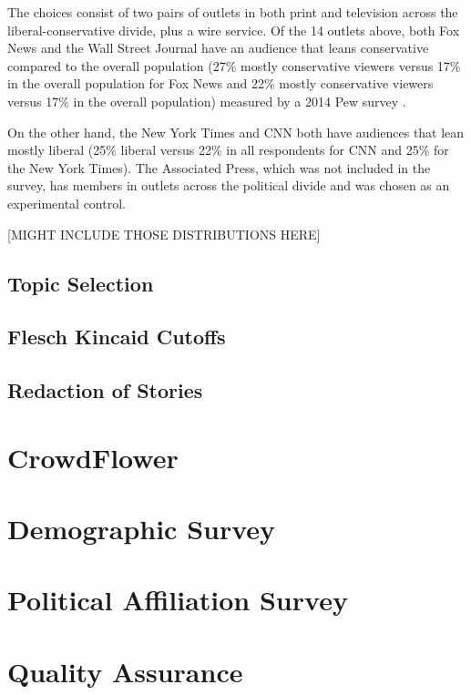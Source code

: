 The choices consist of two pairs of outlets in both print and television across the liberal-conservative divide, plus a wire service. Of the 14 outlets above, both Fox News and the Wall Street Journal have an audience that leans conservative compared to the overall population (27\% mostly conservative viewers versus 17\% in the overall population for Fox News and 22\% mostly conservative viewers versus 17\% in the overall population) measured by a 2014 Pew survey \cite{PoliticalPolarization}.

On the other hand, the New York Times and CNN both have audiences that lean mostly liberal (25\% liberal versus 22\% in all respondents for CNN and 25\% for the New York Times). The Associated Press, which was not included in the survey, has members in outlets across the political divide and was chosen as an experimental control. 

[MIGHT INCLUDE THOSE DISTRIBUTIONS HERE]

\subsection {Topic Selection}










\subsection {Flesch Kincaid Cutoffs}
\subsection {Redaction of Stories}

 

\section{CrowdFlower}
\section{Demographic Survey}
\section{Political Affiliation Survey}
\section{Quality Assurance}
